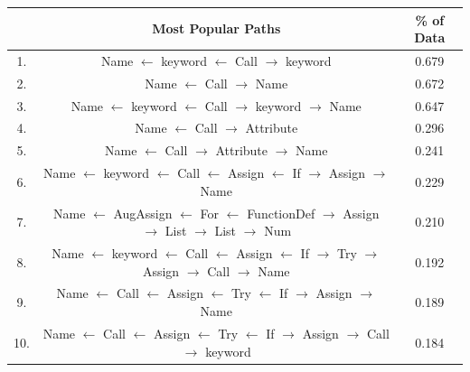 \begin{table}[p]

    \begin{tabular}{c | c | c}       
    
    & Most Popular Paths  &  \% of Data \\  
   \hline
                
1.  & Name $\leftarrow$ keyword $\leftarrow$ Call $\rightarrow$ keyword &  0.679 \\ 
2.  & Name $\leftarrow$ Call $\rightarrow$ Name &  0.672 \\ 
3.  & Name $\leftarrow$ keyword $\leftarrow$ Call $\rightarrow$ keyword $\rightarrow$ Name &  0.647 \\ 
4.  & Name $\leftarrow$ Call $\rightarrow$ Attribute &  0.296 \\ 
5.  & Name $\leftarrow$ Call $\rightarrow$ Attribute $\rightarrow$ Name &  0.241 \\ 
6.  & Name $\leftarrow$ keyword $\leftarrow$ Call $\leftarrow$ Assign $\leftarrow$ If $\rightarrow$ Assign $\rightarrow$ Name &  0.229 \\ 
7.  & Name $\leftarrow$ AugAssign $\leftarrow$ For $\leftarrow$ FunctionDef $\rightarrow$ Assign $\rightarrow$ List $\rightarrow$ List $\rightarrow$ Num &  0.210 \\ 
8.  & Name $\leftarrow$ keyword $\leftarrow$ Call $\leftarrow$ Assign $\leftarrow$ If $\rightarrow$ Try $\rightarrow$ Assign $\rightarrow$ Call $\rightarrow$ Name &  0.192 \\ 
9.  & Name $\leftarrow$ Call $\leftarrow$ Assign $\leftarrow$ Try $\leftarrow$ If $\rightarrow$ Assign $\rightarrow$ Name &  0.189 \\ 
10.  & Name $\leftarrow$ Call $\leftarrow$ Assign $\leftarrow$ Try $\leftarrow$ If $\rightarrow$ Assign $\rightarrow$ Call $\rightarrow$ keyword &  0.184 \\ 
  

\end{tabular}
\end{table}
